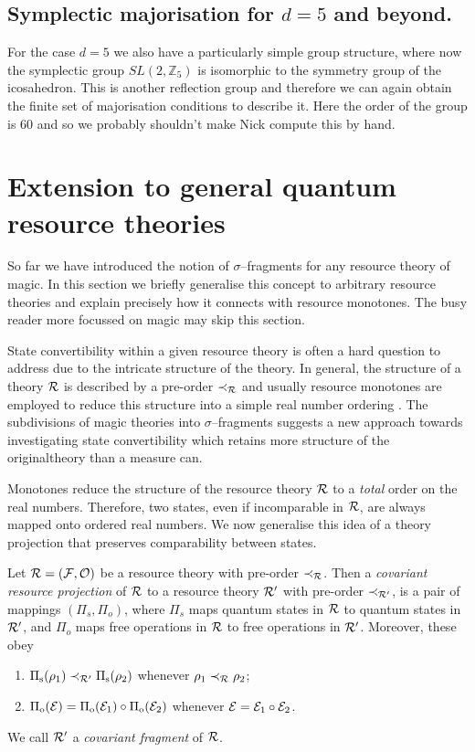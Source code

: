 \documentclass[pra,
aps,
twocolumn,
superscriptaddress,
groupedaddress,
nofootinbib,
reprint
]{revtex4-1}
\begin{document}
\subsection{Symplectic majorisation for $d =5$ and beyond.}
For the case $d=5$ we also have a particularly simple group structure, where now the symplectic group $SL(2, \mathbb{Z}_5)$ is isomorphic to the symmetry group of the icosahedron. This is another reflection group and therefore we can again obtain the finite set of majorisation conditions to describe it. Here the order of the group is $60$ and so we probably shouldn't make Nick compute this by hand.

\null\newpage

\section{Extension to general quantum resource theories}
\label{sec:frag}

So far we have introduced the notion of $\sigma$--fragments for any resource theory of magic. 
In this section we briefly generalise this concept to arbitrary resource theories and explain precisely how it connects with resource monotones. 
The busy reader more focussed on magic may skip this section.

State convertibility within a given resource theory is often a hard question to address due to the intricate structure of the theory.
In general, the structure of a theory ${\mathcal R}$ is described by a pre-order $\prec_{\mathcal R}$ and usually resource monotones are employed to reduce this structure into a simple real number ordering .
The subdivisions of magic theories into $\sigma$--fragments suggests a new approach towards investigating state convertibility which retains more structure of the originaltheory than a measure can.

Monotones reduce the structure of the resource theory ${\mathcal R}$ to a \emph{total} order on the real numbers.
Therefore, two states, even if incomparable in ${\mathcal R}$, are always mapped onto ordered real numbers.
We now generalise this idea of a theory projection that preserves comparability between states. 
\begin{definition}\label{def:covproj}
Let ${\mathcal R} = ({\mathcal F}, {\mathcal O})$ be a resource theory with pre-order $\prec_{\mathcal R}$. 
Then a \emph{covariant resource projection} of ${\mathcal R}$ to a resource theory ${\mathcal R}'$ with pre-order $\prec_{{\mathcal R}'}$, is a pair of mappings $(\Pi_s, \Pi_o)$, where $\Pi_s$ maps quantum states in ${\mathcal R}$ to quantum states in ${\mathcal R}'$, and $\Pi_o$ maps free operations in ${\mathcal R}$ to free operations in ${\mathcal R}'$. 
Moreover, these obey
	\begin{enumerate}
        \item $\Pi_{\rm{s}}(\rho_1) \prec_{{\mathcal R}'} \Pi_{\rm{s}}(\rho_2)$ whenever $\rho_1 \prec_{\mathcal R} \rho_2$;
        \item $\Pi_{\rm{o}}({\mathcal E}) = \Pi_{\rm{o}}({\mathcal E}_1) \circ \Pi_{\rm{o}}({\mathcal E}_2)$ whenever ${\mathcal E} = {\mathcal E}_1 \circ {\mathcal E}_2$.
    \end{enumerate}
We call ${\mathcal R}'$ a \emph{covariant fragment} of ${\mathcal R}$.
\end{definition}
\end{document}
